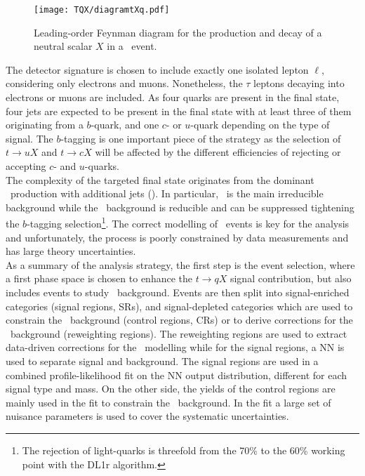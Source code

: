 \begin{figure}[htbp]
    \RawFloats
    \begin{center}
    \texttt{[image: TQX/diagramtXq.pdf]}
    \caption{
        Leading-order Feynman diagram for the production and decay of a neutral scalar $X$ in a \ttbar\ event.
    }
    \label{tqx:feynman2}
    \end{center}
\end{figure}

The detector signature is chosen to include exactly one isolated lepton $\ell$, considering only electrons and muons. Nonetheless, the $\tau$ leptons decaying into electrons or muons are included. As four quarks are present in the final state, four jets are expected to be present in the final state with at least three of them originating from a $b$-quark, and one $c$- or $u$-quark depending on the type of signal. The $b$-tagging is one important piece of the strategy as the selection of $t\to uX$ and $t\to cX$ will be affected by the different efficiencies of rejecting or accepting $c$- and $u$-quarks.\\

The  complexity of the targeted final state originates from the dominant \ttbar\ production with additional jets (\ttjets). In particular, \ttb\ is the main irreducible background while the \ttl\ background is reducible and can be suppressed tightening the $b$-tagging selection\footnote{The rejection of light-quarks is threefold from the 70\% to the 60\% working point with the DL1r algorithm.}. The correct modelling of \ttbar\ events is key for the analysis and unfortunately, the process is poorly constrained by data measurements and has large theory uncertainties.\\

As a summary of the analysis strategy, the first step is the event selection, where a first phase space is chosen to enhance the $t\to qX$ signal contribution, but also includes events to study \ttjets\ background. Events are then split into signal-enriched categories (signal regions, SRs), and signal-depleted categories which are used to constrain the \ttb\ background (control regions, CRs) or to derive corrections for the \ttjets\ background (reweighting regions). The reweighting regions are used to extract data-driven corrections for the \ttbar\ modelling while for the signal regions, a NN is used to separate signal and background. The signal regions are used in a combined profile-likelihood fit on the NN output distribution, different for each signal type and mass. On the other side, the yields of the control regions are mainly used in the fit to constrain the \ttb\ background. In the fit a large set of nuisance parameters is used to cover the systematic uncertainties.\\

